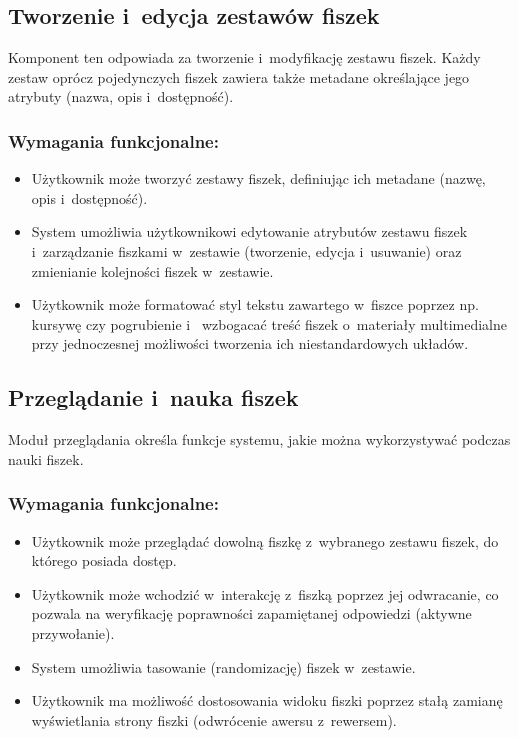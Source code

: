 \subsection*{Tworzenie i~edycja zestawów fiszek}
Komponent ten odpowiada za tworzenie i~modyfikację zestawu fiszek. Każdy zestaw 
oprócz pojedynczych fiszek zawiera także metadane określające jego atrybuty (nazwa, opis i~dostępność). 

\subsubsection*{Wymagania funkcjonalne:}
\begin{itemize}
    \item Użytkownik może tworzyć zestawy fiszek, definiując ich metadane (nazwę, opis i~dostępność).
    \item System umożliwia użytkownikowi edytowanie atrybutów zestawu fiszek i~zarządzanie fiszkami 
    w~zestawie (tworzenie, edycja i~usuwanie) oraz zmienianie kolejności fiszek w~zestawie.
    \item Użytkownik może formatować styl tekstu zawartego w~fiszce poprzez np. kursywę czy pogrubienie i~
    wzbogacać treść fiszek o~materiały multimedialne przy jednoczesnej możliwości tworzenia ich niestandardowych układów.
\end{itemize}

\subsection*{Przeglądanie i~nauka fiszek}
Moduł przeglądania określa funkcje systemu, jakie można wykorzystywać podczas nauki fiszek.

\subsubsection*{Wymagania funkcjonalne:}
\begin{itemize}
    \item Użytkownik może przeglądać dowolną fiszkę z~wybranego zestawu fiszek, do którego posiada dostęp.
    \item Użytkownik może wchodzić w~interakcję z~fiszką poprzez jej odwracanie, co pozwala na weryfikację poprawności 
    zapamiętanej odpowiedzi (aktywne przywołanie).
    \item System umożliwia tasowanie (randomizację) fiszek w~zestawie.
    \item Użytkownik ma możliwość dostosowania widoku fiszki poprzez stałą zamianę wyświetlania strony fiszki (odwrócenie awersu z~rewersem).
\end{itemize}

